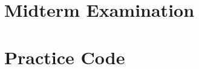 \documentclass[12pt,openany]{book}
\begin{document}

\tableofcontents
\newpage

%
%
%

\chapter{Midterm Examination}


\chapter{Practice Code}

%

\newpage
%
\end{document}
